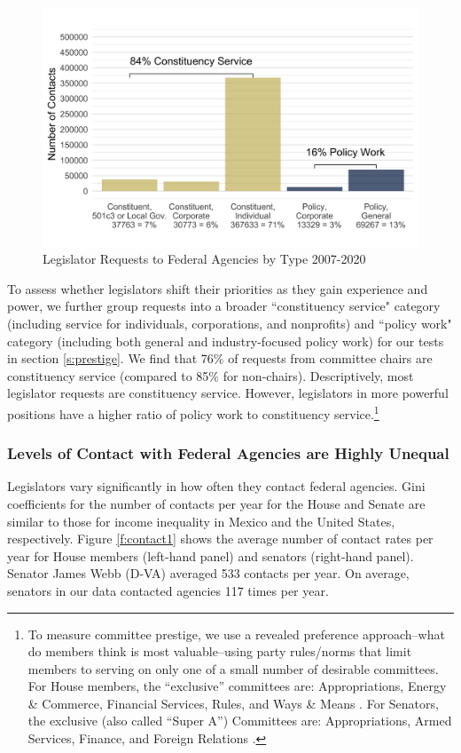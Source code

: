 \documentclass[12pt]{article}
\begin{document}
\begin{figure}[hbt!]
\centering
\caption{Legislator Requests to Federal Agencies by Type 2007-2020} \label{f:type2}
\includegraphics[width = .8\textwidth]{figs/data_by_type-tall-1}
\end{figure}



To assess whether legislators shift their priorities as they gain experience and power, we further group requests into a broader ``constituency service"  category (including service for individuals, corporations, and nonprofits) and ``policy work" category (including both general and industry-focused policy work) for our tests in section \ref{s:prestige}. We find that 76\% of requests from committee chairs are constituency service (compared to 85\% for non-chairs). %
Descriptively, most legislator requests are constituency service. However, legislators in more powerful positions have a higher ratio of policy work to constituency service.\footnote{To measure committee prestige, we use a revealed preference approach--what do members think is most valuable--using party rules/norms that limit members to serving on only one of a small number of desirable committees. For House members, the ``exclusive'' committees are: Appropriations, Energy \& Commerce, Financial Services, Rules, and Ways \& Means \citep{CRS2022}. For Senators, the exclusive (also called ``Super A'') Committees are: Appropriations, Armed Services, Finance, and Foreign Relations \citep{CRS2024}.} %


\subsubsection{Levels of Contact with Federal Agencies are Highly Unequal}
Legislators vary significantly in how often they contact federal agencies. Gini coefficients for the number of contacts per year for the House and Senate are similar to those for income inequality in Mexico and the United States, respectively. Figure \ref{f:contact1} shows the average number of contact rates per year for House members (left-hand panel) and senators (right-hand panel). Senator James Webb (D-VA) averaged 533 contacts per year. %
On average, senators in our data contacted agencies 117 times per year.   
 
\end{document}
